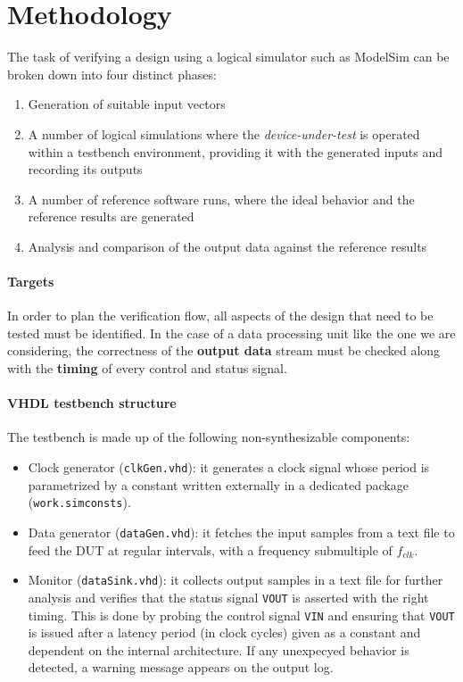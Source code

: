 \section{Methodology}
The task of verifying a design using a logical simulator such as ModelSim can be broken down into four distinct phases:
\begin{enumerate}
    \item Generation of suitable input vectors
    \item A number of logical simulations where the \textit{device-under-test} is operated within a testbench environment, providing it with the generated inputs and recording its outputs
    \item A number of reference software runs, where the ideal behavior and the reference results are generated
    \item Analysis and comparison of the output data against the reference results
\end{enumerate}

\paragraph{Targets} In order to plan the verification flow, all aspects of the design that need to be tested must be identified. In the case of a data processing unit like the one we are considering, the correctness of the \textbf{output data} stream must be checked along with the \textbf{timing} of every control and status signal.

\paragraph{VHDL testbench structure} The testbench is made up of the following non-synthesizable components:
\begin{itemize}
	\item Clock generator (\texttt{clkGen.vhd}): it generates a clock signal whose period is parametrized by a constant written externally in a dedicated package (\texttt{work.simconsts}).
	\item Data generator (\texttt{dataGen.vhd}): it fetches the input samples from a text file to feed the DUT at regular intervals, with a frequency submultiple of $f_{clk}$.
	\item Monitor (\texttt{dataSink.vhd}): it collects output samples in a text file for further analysis and verifies that the status signal \texttt{VOUT} is asserted with the right timing. This is done by probing the control signal \texttt{VIN} and ensuring that \texttt{VOUT} is issued after a latency period (in clock cycles) given as a constant and dependent on the internal architecture. If any unexpecyed behavior is detected, a warning message appears on the output log.
\end{itemize}

